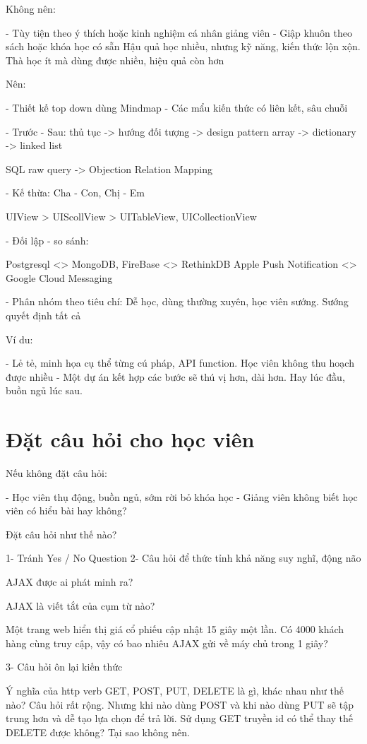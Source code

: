 Không nên:

- Tùy tiện theo ý thích hoặc kinh nghiệm cá nhân giảng viên
- Giập khuôn theo sách hoặc khóa học có sẵn
Hậu quả học nhiều, nhưng kỹ năng, kiến thức lộn xộn. Thà học ít mà dùng được nhiều, hiệu quả còn hơn

Nên:

- Thiết kế top down dùng Mindmap
- Các mẩu kiến thức có liên kết, sâu chuỗi

- Trước - Sau:
 thủ tục -> hướng đối tượng -> design pattern
 array -> dictionary -> linked list

 SQL raw query -> Objection Relation Mapping

- Kế thừa: Cha - Con, Chị - Em

 UIView > UIScollView > UITableView, UICollectionView

- Đối lập - so sánh:

 Postgresql <> MongoDB, FireBase <> RethinkDB
 Apple Push Notification <> Google Cloud Messaging

- Phân nhóm theo tiêu chí: Dễ học, dùng thường xuyên, học viên sướng. Sướng quyết định tất cả

Ví du:

- Lẻ tẻ, minh họa cụ thể từng cú pháp, API function. Học viên không thu hoạch được nhiều
- Một dự án kết hợp các bước sẽ thú vị hơn, dài hơn. Hay lúc đầu, buồn ngủ lúc sau.

\section{Đặt câu hỏi cho học viên}


Nếu không đặt câu hỏi:

- Học viên thụ động, buồn ngủ, sớm rời bỏ khóa học
- Giảng viên không biết học viên có hiểu bài hay không?

Đặt câu hỏi như thế nào?

1- Tránh Yes / No Question
2- Câu hỏi để thức tỉnh khả năng suy nghĩ, động não

AJAX được ai phát minh ra?

AJAX là viết tắt của cụm từ nào?

Một trang web hiển thị giá cổ phiếu cập nhật 15 giây một lần. Có 4000 khách hàng cùng truy cập, vậy có bao nhiêu AJAX gửi về máy chủ trong 1 giây?

3- Câu hỏi ôn lại kiến thức

Ý nghĩa của http verb GET, POST, PUT, DELETE là gì, khác nhau như thế nào? Câu hỏi rất rộng.
Nhưng khi nào dùng POST và khi nào dùng PUT sẽ tập trung hơn và dễ tạo lựa chọn để trả lời.
Sử dụng GET truyền id có thể thay thế DELETE được không? Tại sao không nên.

